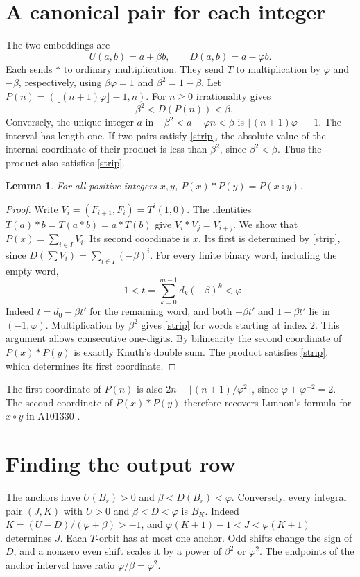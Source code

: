 \documentclass[11pt]{article}
\newtheorem{lemma}[theorem]{Lemma}
\newcommand{\ph}{\varphi}
\newcommand{\fl}[1]{\lfloor #1\rfloor}
\begin{document}
\newpage
\section{A canonical pair for each integer}
The two embeddings are
\[
 U(a,b)=a+\beta b,\qquad D(a,b)=a-\ph b.
\]
Each sends $*$ to ordinary multiplication. They send $T$ to multiplication by
$\ph$ and $-\beta$, respectively, using $\beta\ph=1$ and $\beta^2=1-\beta$.
Let $P(n)=(\fl{(n+1)\ph}-1,n)$. For $n\ge0$ irrationality gives
\begin{equation}\label{strip}
    -\beta^2<D(P(n))<\beta.
\end{equation}
Conversely, the unique integer $a$ in $-\beta^2<a-\ph n<\beta$ is
$\fl{(n+1)\ph}-1$. The interval has length one. If two pairs satisfy
\eqref{strip}, the absolute value of the internal coordinate of their product is
less than $\beta^2$, since $\beta^2<\beta$. Thus the product also satisfies
\eqref{strip}.

\begin{lemma}\label{knuth}
For all positive integers $x,y$, $P(x)*P(y)=P(x\circ y)$.
\end{lemma}
\begin{proof}
Write $V_i=(F_{i+1},F_i)=T^i(1,0)$. The identities
$T(a)*b=T(a*b)=a*T(b)$ give $V_i*V_j=V_{i+j}$.
We show that $P(x)=\sum_{i\in I}V_i$. Its second coordinate is $x$.
Its first is determined by \eqref{strip}, since
$D(\sum V_i)=\sum_{i\in I}(-\beta)^i$. For every finite binary word,
including the empty word,
\[
   -1< t=\sum_{k=0}^{m-1}d_k(-\beta)^k <\ph.
\]
Indeed $t=d_0-\beta t'$ for the remaining word, and both $-\beta t'$ and
$1-\beta t'$ lie in $(-1,\ph)$. Multiplication by $\beta^2$ gives
\eqref{strip} for words starting at index $2$. This argument allows consecutive
one-digits.
By bilinearity the second coordinate of $P(x)*P(y)$ is exactly Knuth's double sum.
The product satisfies \eqref{strip}, which determines its first coordinate.
\end{proof}

The first coordinate of $P(n)$ is also
$2n-\fl{(n+1)/\ph^2}$, since $\ph+\ph^{-2}=2$.
The second coordinate of $P(x)*P(y)$ therefore recovers Lunnon's formula for
$x\circ y$ in A101330 \cite{knuth}.

\section{Finding the output row}
The anchors have $U(B_r)>0$ and $\beta<D(B_r)<\ph$. Conversely, every integral
pair $(J,K)$ with $U>0$ and $\beta<D<\ph$ is $B_K$. Indeed
$K=(U-D)/(\ph+\beta)>-1$, and
$\ph(K+1)-1<J<\ph(K+1)$ determines $J$. Each $T$-orbit has at most one
anchor. Odd shifts change the sign of $D$, and a nonzero even shift scales it
by a power of $\beta^2$ or $\ph^2$. The endpoints of the anchor interval
have ratio $\ph/\beta=\ph^2$.
\end{document}
